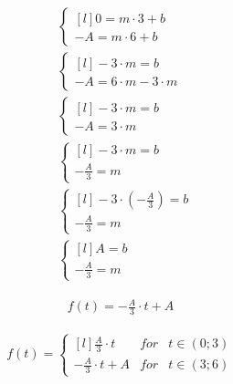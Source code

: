 \begin{task}
\begin{align*}
&\left\{\begin{matrix*}[l]
0 = m\cdot 3 +b\\ 
-A = m\cdot 6 +b
\end{matrix*}\right. \\
&\left\{\begin{matrix*}[l]
-3 \cdot m = b\\ 
-A = 6 \cdot m -3 \cdot m
\end{matrix*}\right. \\
&\left\{\begin{matrix*}[l]
-3 \cdot m = b\\ 
-A = 3 \cdot m
\end{matrix*}\right. \\
&\left\{\begin{matrix*}[l]
-3 \cdot m = b\\  
-\frac{A}{3} = m
\end{matrix*}\right. \\
&\left\{\begin{matrix*}[l]
-3 \cdot (-\frac{A}{3}) = b\\
-\frac{A}{3} = m
\end{matrix*}\right. \\
&\left\{\begin{matrix*}[l]
A = b\\
-\frac{A}{3} = m
\end{matrix*}\right.
\end{align*}


\begin{align*}
f(t) = -\frac{A}{3}\cdot t + A
\end{align*}


\begin{align*}
f(t) = \left\{\begin{matrix*}[l]
\frac{A}{3}\cdot t & for &t \in (0;3)\\ 
-\frac{A}{3}\cdot t + A & for & t \in (3; 6)
\end{matrix*}\right.
\end{align*}


\end{task}
